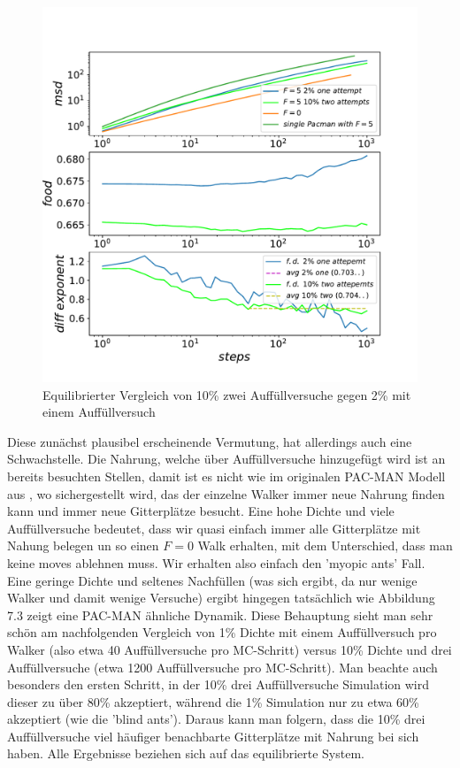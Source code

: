 \documentclass[a4paper, 12pt]{report}
\begin{document}
\begin{figure}[H]
	\centering
	\includegraphics[scale=0.75]{10_2_vs_2_1.pdf}
	\caption{Equilibrierter Vergleich von 10\% zwei Auffüllversuche gegen 2\% mit einem Auffüllversuch}
\end{figure}

\clearpage

\noindent Diese zunächst plausibel erscheinende Vermutung, hat allerdings auch eine Schwachstelle.  Die Nahrung, welche über Auffüllversuche hinzugefügt wird ist an bereits besuchten Stellen, damit ist es nicht wie im originalen PAC-MAN Modell aus \cite{doi:10.1063/1.4999485}, wo sichergestellt wird, das der einzelne Walker immer neue Nahrung finden kann und immer neue Gitterplätze besucht. Eine hohe Dichte und viele Auffüllversuche bedeutet, dass wir quasi einfach immer alle Gitterplätze mit Nahung belegen un so einen $F=0$ Walk erhalten, mit dem Unterschied, dass man keine moves ablehnen muss. Wir erhalten also einfach den 'myopic ants' Fall. Eine geringe Dichte und seltenes Nachfüllen (was sich ergibt, da nur wenige Walker und damit wenige Versuche) ergibt hingegen tatsächlich wie Abbildung 7.3 zeigt eine PAC-MAN ähnliche Dynamik. Diese Behauptung sieht man sehr schön am nachfolgenden Vergleich von 1\% Dichte mit einem Auffüllversuch pro Walker (also etwa 40 Auffüllversuche pro MC-Schritt) versus 10\% Dichte und drei Auffüllversuche (etwa 1200 Auffüllversuche pro MC-Schritt). Man beachte auch besonders den ersten Schritt, in der 10\% drei Auffüllversuche Simulation wird dieser zu über 80\% akzeptiert, während die 1\% Simulation nur zu etwa 60\% akzeptiert (wie die 'blind ants'). Daraus kann man folgern, dass die 10\% drei Auffüllversuche viel häufiger benachbarte Gitterplätze mit Nahrung bei sich haben. Alle Ergebnisse beziehen sich auf das equilibrierte System.
\end{document}
